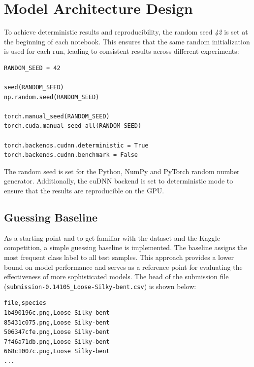 \section{Model Architecture Design}

To achieve deterministic results and reproducibility, the random seed \textit{42} is set at the beginning of each notebook. This ensures that the same random initialization is used for each run, leading to consistent results across different experiments:

\begin{minipage}{0.9\linewidth}\begin{lstlisting}[caption={Settings to achieve deterministic results and ensure reproducibility.},label={lst:deterministic-results}]
RANDOM_SEED = 42

seed(RANDOM_SEED)
np.random.seed(RANDOM_SEED)

torch.manual_seed(RANDOM_SEED)
torch.cuda.manual_seed_all(RANDOM_SEED)

torch.backends.cudnn.deterministic = True
torch.backends.cudnn.benchmark = False
\end{lstlisting}\end{minipage}

The random seed is set for the Python, NumPy and PyTorch random number generator. Additionally, the cuDNN backend is set to deterministic mode to ensure that the results are reproducible on the GPU.

\subsection{Guessing Baseline}

As a starting point and to get familiar with the dataset and the Kaggle competition, a simple guessing baseline is implemented. The baseline assigns the most frequent class label to all test samples. This approach provides a lower bound on model performance and serves as a reference point for evaluating the effectiveness of more sophisticated models. The head of the submission file (\texttt{submission-0.14105\_Loose-Silky-bent.csv}) is shown below:

\begin{minipage}{0.9\linewidth}\begin{lstlisting}[language={},caption={Head of guessing baseline submission file.},label={lst:guessing-baseline}]
file,species
1b490196c.png,Loose Silky-bent
85431c075.png,Loose Silky-bent
506347cfe.png,Loose Silky-bent
7f46a71db.png,Loose Silky-bent
668c1007c.png,Loose Silky-bent
...
\end{lstlisting}\end{minipage}

